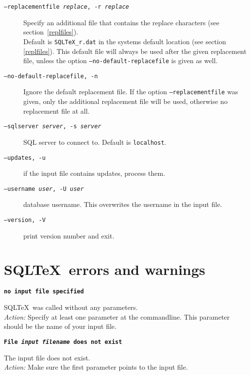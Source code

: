 \documentclass{article}
\newcommand{\vs}{\vspace{3mm}}
\begin{document}
\begin{description}
\item[\texttt{--replacementfile \textit{replace}, -r \textit{replace}}] Specify an additional file that contains the replace characters (see section~\ref{replfiles}). \\
Default is \texttt{SQLTeX{\_}r.dat} in the systems default location (see section \ref{replfiles}). This default file will always be used after the given replacement file, unless the option \texttt{--no-default-replacefile} is given as well.

\item[\texttt{--no-default-replacefile, -n}] Ignore the default replacement file. If the option \texttt{--replacementfile} was given, only the additional replacement file will be used, otherwise no replacement file at all.

\item[\texttt{--sqlserver \textit{server}, -s \textit{server}}] SQL server to connect to. Default is \texttt{localhost}.

\item[\texttt{--updates, -u}] if the input file contains updates, process them.

\item[\texttt{--username \textit{user}, -U \textit{user}}] database username. This overwrites the username in the input file.

\item[\texttt{--version, -V}] print version number and exit.
\end{description}



\section{SQL\TeX\ errors and warnings}

\noindent\textbf{\texttt{no input file specified}}

\vspace{1mm}

\noindent SQL\TeX\ was called without any parameters.\\
\textit{Action:} Specify at least one parameter at the commandline. This parameter should be
the name of your input file.

\vs

\noindent\textbf{\texttt{File \textit{input filename} does not exist}}

\vspace{1mm}

\noindent The input file does not exist.\\
\textit{Action:} Make sure the first parameter points to the input file.
\end{document}
